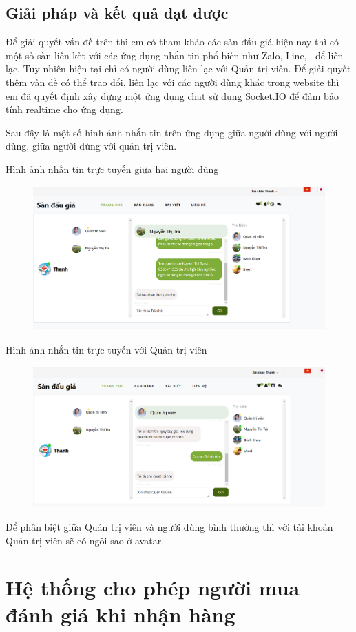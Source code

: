 \documentclass[../DoAn.tex]{subfiles}
\begin{document}
\subsection{Giải pháp và kết quả đạt được}
Để giải quyết vấn đề trên thì em có tham khảo các sàn đấu giá hiện nay thì có một số sàn liên kết với các ứng dụng nhắn tin phổ biến như Zalo, Line,.. để liên lạc. Tuy nhiên hiện tại chỉ có người dùng liên lạc với Quản trị viên. Để giải quyết thêm vấn đề có thể trao đổi, liên lạc với các người dùng khác trong website thì em đã quyết định xây dựng một ứng dụng chat sử dụng Socket.IO để đảm bảo tính realtime cho ứng dụng.

Sau đây là một số hình ảnh nhắn tin trên ứng dụng giữa người dùng với người dùng, giữa người dùng với quản trị viên. 

Hình ảnh nhắn tin trực tuyến giữa hai người dùng
\begin{figure}[H]
    \centering
    \includegraphics[width=11.4cm,height=5.55cm]{Hinhve/chatuser.png}
\end{figure}
Hình ảnh nhắn tin trực tuyến với Quản trị viên
\begin{figure}[H]
    \centering
    \includegraphics[width=11.4cm,height=5.42cm]{Hinhve/chatadmin.png}
\end{figure}
Để phân biệt giữa Quản trị viên và người dùng bình thường thì với tài khoản Quản trị viên sẽ có ngôi sao ở avatar.
\section{Hệ thống cho phép người mua đánh giá khi nhận hàng}
\end{document}
